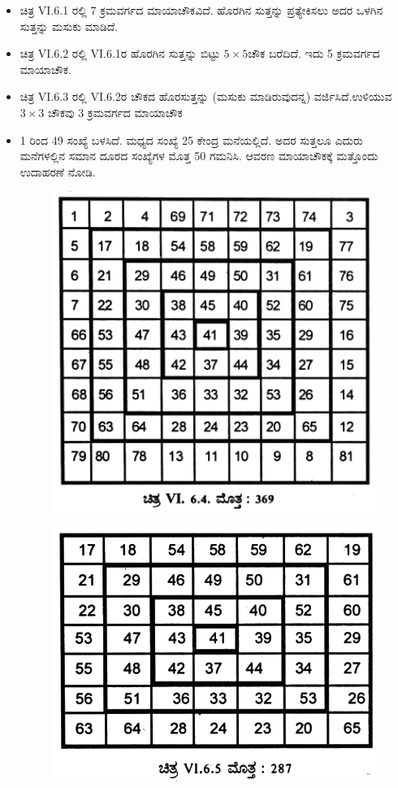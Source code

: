 \begin{itemize}
	\item ಚಿತ್ರ VI.6.1 ರಲ್ಲಿ 7 ಕ್ರಮವರ್ಗದ ಮಾಯಾಚೌಕವಿದೆ. ಹೊರಗಿನ ಸುತ್ತನ್ನು \hbox{ಪ್ರತ್ಯೇಕಿಸಲು} ಅದರ ಒಳಗಿನ ಸುತ್ತನ್ನು ಮಸುಕು ಮಾಡಿದೆ.
	\item ಚಿತ್ರ VI.6.2 ರಲ್ಲಿ VI.6.1ರ ಹೊರಗಿನ ಸುತ್ತನ್ನು ಬಿಟ್ಟು $5 \times 5$ಚೌಕ ಬರೆದಿದೆ. ಇದು 5 ಕ್ರಮವರ್ಗದ ಮಾಯಾಚೌಕ.
	\item ಚಿತ್ರ VI.6.3 ರಲ್ಲಿ VI.6.2ರ ಚೌಕದ ಹೊರಸುತ್ತನ್ನು (ಮಸುಕು ಮಾಡಿರು\-ವುದನ್ನ) ವರ್ಜಿಸಿದೆ.ಉಳಿಯುವ $3 \times 3$ ಚೌಕವು 3 ಕ್ರಮವರ್ಗದ ಮಾಯಾಚೌಕ
	\item 1 ರಿಂದ 49 ಸಂಖ್ಯೆ ಬಳಸಿದೆ. ಮಧ್ಯದ ಸಂಖ್ಯೆ 25 ಕೇಂದ್ರ ಮನೆಯಲ್ಲಿದೆ. ಅದರ ಸುತ್ತಲೂ ಎದುರು ಮನೆಗಳಲ್ಲಿನ ಸಮಾನ ದೂರದ ಸಂಖ್ಯೆಗಳ ಮೊತ್ತ 50 ಗಮನಿಸಿ. ಆವರಣ ಮಾಯಾಚೌಕಕ್ಕೆ ಮತ್ತೊಂದು ಉದಾಹರಣೆ ನೋಡಿ.
	\begin{figure}[H]
	\includegraphics[scale=.9]{src/figures/chap5/fig5-10.jpg}
	\end{figure}
	\begin{figure}[H]
	\includegraphics[scale=.9]{src/figures/chap5/fig5-11.jpg}

\end{figure}
\end{itemize}
